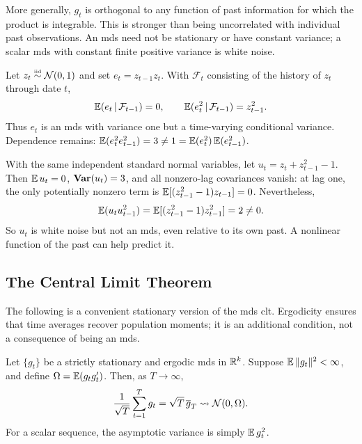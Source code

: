 \documentclass[a4paper,12pt]{article}
\begin{document}
\begin{remark}
	More generally, $g_t$ is orthogonal to any function of past information for which the product is integrable.
	This is stronger than being uncorrelated with individual past observations.
	An \gls{mds} need not be stationary or have constant variance;
	a scalar \gls{mds} with constant finite positive variance is white noise.
\end{remark}

\begin{example}
	Let $z_t\overset{\text{\tiny iid}}{\sim}\operatorname{\mathcal{N}}(0,1)$ and set $e_t=z_{t-1}z_t$.
	With $\mathcal F_t$ consisting of the history of $z_t$ through date $t$,
	\begin{align}
		\operatorname{\mathbb{E}}(e_t\mathpunct{}|\mathpunct{}\mathcal F_{t-1})=0,
		\qquad \operatorname{\mathbb{E}}(e_t^2\mathpunct{}|\mathpunct{}\mathcal F_{t-1})=z_{t-1}^2.
	\end{align}
	Thus $e_t$ is an \gls{mds} with variance one but a time-varying conditional variance.
	Dependence remains: $\operatorname{\mathbb{E}}(e_t^2e_{t-1}^2)=3\neq1=\operatorname{\mathbb{E}}(e_t^2)\operatorname{\mathbb{E}}(e_{t-1}^2)$.
\end{example}

\begin{example}
	With the same independent standard normal variables, let $u_t=z_t+z_{t-1}^2-1$.
	Then $\operatorname{\mathbb{E}} u_t=0$, $\operatorname{\text{\textrm{\upshape\textbf{Var}}}}(u_t)=3$, and all nonzero-lag covariances vanish:
	at lag one, the only potentially nonzero term is $\operatorname{\mathbb{E}}[(z_{t-1}^2-1)z_{t-1}]=0$.
	Nevertheless,
	\begin{align}
		\operatorname{\mathbb{E}}(u_tu_{t-1}^2)=\operatorname{\mathbb{E}}[(z_{t-1}^2-1)z_{t-1}^2]=2\neq0.
	\end{align}
	So $u_t$ is white noise but not an \gls{mds}, even relative to its own past.
	A nonlinear function of the past can help predict it.
\end{example}

\subsection{The Central Limit Theorem}

The following is a convenient stationary version of the \gls{mds} \gls{clt}.
Ergodicity ensures that time averages recover population moments;
it is an additional condition, not a consequence of being an \gls{mds}.

\begingroup
{}
\begin{theorem}\label{thm-mds-clt}
	Let $\{g_t\}$ be a strictly stationary and ergodic \gls{mds} in $\mathbb{R}^k$.
	Suppose $\operatorname{\mathbb{E}}\|g_t\|^2<\infty$, and define $\Omega=\operatorname{\mathbb{E}}(g_tg_t^{\prime})$.
	Then, as $T\to\infty$,
	\begin{align}\label{eq-mds-clt}
		\frac1{\sqrt T}\sum_{t=1}^Tg_t
		=\sqrt T\,\overline g_T
		\overset{}{\leadsto}\operatorname{\mathcal{N}}(0,\Omega).
	\end{align}
	For a scalar sequence, the asymptotic variance is simply $\operatorname{\mathbb{E}} g_t^2$.
\end{theorem}
\endgroup
\end{document}
